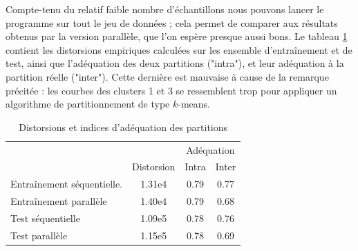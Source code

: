 \documentclass[12pt]{article}
\begin{document}
Compte-tenu du relatif faible nombre d'échantillons nous pouvons lancer le programme sur tout le jeu de données ; 
cela permet de comparer aux résultats obtenus par la version parallèle, que l'on espère presque aussi bons. 
Le tableau \ref{tabDistorSl} contient les distorsions empiriques calculées sur les ensemble d'entraînement et de test, 
ainsi que l'adéquation des deux partitions ("intra"), et leur adéquation à la partition réelle ("inter"). Cette dernière est mauvaise à cause de la remarque précitée :
les courbes des clusters 1 et 3 se ressemblent trop pour appliquer un algorithme de partitionnement de type $k$-means.\\

\begin{table}[H]
\centering
\begin{tabular}{lccc}
\toprule
 &            & \multicolumn{2}{c}{Adéquation} \\
 & Distorsion & Intra & Inter \\
\midrule
Entraînement séquentielle. & 1.31e4 & 0.79 & 0.77\\
Entraînement parallèle & 1.40e4 & 0.79 & 0.68\\
Test séquentielle & 1.09e5 & 0.78 & 0.76\\
Test parallèle & 1.15e5 & 0.78 & 0.69\\
\bottomrule
\end{tabular}
\caption{Distorsions et indices d'adéquation des partitions}
\label{tabDistorSl}
\end{table}


\end{document}
